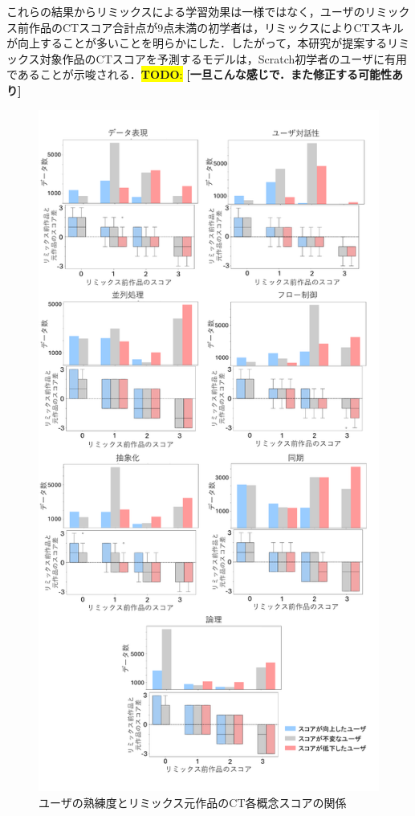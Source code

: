 \documentclass[submit,techrep,noauthor]{ipsj}
\newcommand{\todo}[1]{\colorbox{yellow}{{\bf TODO}:}{\color{red} {\textbf{[#1]}}}}
\begin{document}
これらの結果からリミックスによる学習効果は一様ではなく，ユーザのリミックス前作品のCTスコア合計点が9点未満の初学者は，リミックスによりCTスキルが向上することが多いことを明らかにした．したがって，本研究が提案するリミックス対象作品のCTスコアを予測するモデルは，Scratch初学者のユーザに有用であることが示唆される．\todo{一旦こんな感じで．また修正する可能性あり}



\begin{figure}[t]
  \centering
  \includegraphics[width=\linewidth]{@IPSJ_SIGSE202511_Horio/fig/preAnalysis2.pdf}
  \caption{ユーザの熟練度とリミックス元作品のCT各概念スコアの関係}
  \label{preAnalysis2}
\end{figure}
\end{document}
